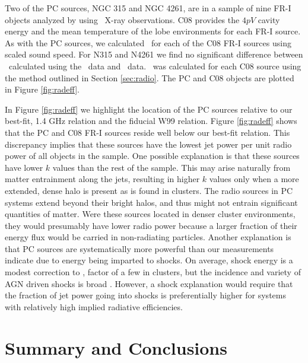 \documentclass{emulateapj}
\begin{document}
Two of the PC sources, NGC 315 and NGC 4261, are in a sample of nine
FR-I objects analyzed by \citet[][hereafter C08]{2008MNRAS.386.1709C}
using \xmm\ X-ray observations. C08 provides the $4pV$ cavity energy
and the mean temperature of the lobe environments for each FR-I
source. As with the PC sources, we calculated \pcav\ for each of the
C08 FR-I sources using scaled sound speed. For N315 and N4261 we find
no significant difference between \pcav\ calculated using the
\chandra\ data and \xmm\ data. \phigh\ was calculated for each C08
source using the method outlined in Section \ref{sec:radio}. The PC
and C08 objects are plotted in Figure \ref{fig:radeff}.

In Figure \ref{fig:radeff} we highlight the location of the PC sources
relative to our best-fit, 1.4 GHz relation and the fiducial W99
relation. Figure \ref{fig:radeff} shows that the PC and C08 FR-I
sources reside well below our best-fit relation. This discrepancy
implies that these sources have the lowest jet power per unit radio
power of all objects in the sample. One possible explanation is that
these sources have lower $k$ values than the rest of the sample. This
may arise naturally from matter entrainment along the jets, resulting
in higher $k$ values only when a more extended, dense halo is present
as is found in clusters. The radio sources in PC systems extend beyond
their bright halos, and thus might not entrain significant quantities
of matter. Were these sources located in denser cluster environments,
they would presumably have lower radio power because a larger fraction
of their energy flux would be carried in non-radiating
particles. Another explanation is that PC sources are systematically
more powerful than our measurements indicate due to energy being
imparted to shocks. On average, shock energy is a modest correction to
\pcav, factor of a few in clusters, but the incidence and variety of
AGN driven shocks is broad \citep[\eg][]{2003ApJ...592..129K,
  hydraa}. However, a shock explanation would require that the
fraction of jet power going into shocks is preferentially higher for
systems with relatively high implied radiative efficiencies.

\section{Summary and Conclusions}
\label{sec:summary}
\end{document}

